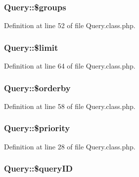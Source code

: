 \subsubsection[{\$groups}]{\setlength{\rightskip}{0pt plus 5cm}Query\+::\$groups}\label{classQuery_a76992fbfae6d700e65dfde28911a2475}


Definition at line 52 of file Query.\+class.\+php.

\hypertarget{classQuery_abe481cf8b7f42b513a4f64cf7fb0ffea}{}
\subsubsection[{\$limit}]{\setlength{\rightskip}{0pt plus 5cm}Query\+::\$limit}\label{classQuery_abe481cf8b7f42b513a4f64cf7fb0ffea}


Definition at line 64 of file Query.\+class.\+php.

\hypertarget{classQuery_aa955216a83dfe57cdd9600b44b38ebac}{}
\subsubsection[{\$orderby}]{\setlength{\rightskip}{0pt plus 5cm}Query\+::\$orderby}\label{classQuery_aa955216a83dfe57cdd9600b44b38ebac}


Definition at line 58 of file Query.\+class.\+php.

\hypertarget{classQuery_a4d64f61fd525a70ebc2aaa6ab8291e20}{}
\subsubsection[{\$priority}]{\setlength{\rightskip}{0pt plus 5cm}Query\+::\$priority}\label{classQuery_a4d64f61fd525a70ebc2aaa6ab8291e20}


Definition at line 28 of file Query.\+class.\+php.

\hypertarget{classQuery_a67666b2fcd6c60e73d8329f7d22044dc}{}
\subsubsection[{\$query\+I\+D}]{\setlength{\rightskip}{0pt plus 5cm}Query\+::\$query\+I\+D}\label{classQuery_a67666b2fcd6c60e73d8329f7d22044dc}


